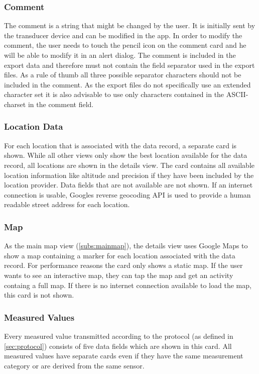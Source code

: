 \subsubsection{Comment}
The comment is a string that might be changed by the user. It is initially sent by the transducer device and can be modified in the app. In order to modify the comment, the user needs to touch the pencil icon on the comment card and he will be able to modify it in an alert dialog. The comment is included in the export data and therefore must not contain the field separator used in the export files. As a rule of thumb all three possible separator characters should not be included in the comment. As the export files do not specifically use an extended character set it is also advisable to use only characters contained in the ASCII-charset in the comment field.

\subsubsection{Location Data}
For each location that is associated with the data record, a separate card is shown. While all other views only show the best location available for the data record, all locations are shown in the details view. The card contains all available location information like altitude and precision if they have been included by the location provider. Data fields that are not available are not shown. If an internet connection is usable, Googles reverse geocoding API is used to provide a human readable street address for each location.

\subsubsection{Map}
As the main map view (\ref{subs:mainmap}), the details view uses Google Maps to show a map containing a marker for each location associated with the data record. For performance reasons the card only shows a static map. If the user wants to see an interactive map, they can tap the map and get an activity containg a full map. If there is no internet connection available to load the map, this card is not shown.

\subsubsection{Measured Values}
Every measured value transmitted according to the protocol (as defined in \ref{sec:protocol}) consists of five data fields which are shown in this card. All measured values have separate cards even if they have the same measurement category or are derived from the same sensor.

